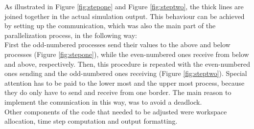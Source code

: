 \documentclass[12pt, a4paper, titlepage]{article}
\begin{document}
{%
As illustrated in Figure \ref{fig:stepone} and Figure \ref{fig:steptwo}, the thick lines are joined together in the actual simulation output. This behaviour can be achieved by setting up the communication, which was also the main part of the parallelization process, in the following way:\\
First the odd-numbered processes send their values to the above and below processes (Figure \ref{fig:stepone}), while the even-numbered ones receive from below and above, respectively. Then, this procedure is repeated with the even-numbered ones sending and the odd-numbered ones receiving (Figure \ref{fig:steptwo}). Special attention has to be paid to the lower most and the upper most process, because they do only have to send and receive from one border. The main reason to implement the comunication in this way, was to avoid a deadlock.\\
Other components of the code that needed to be adjusted were workspace allocation, time step computation and output formatting.

\begin{figure}[h!]
\begin{center}
		\begin{minipage}{0.35\linewidth}
\end{minipage}
\end{center}
\end{figure}}
\end{document}
